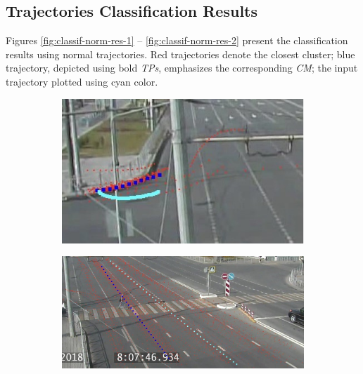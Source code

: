 \subsection{Trajectories Classification Results}


Figures \ref{fig:classif-norm-res-1} -- \ref{fig:classif-norm-res-2} present the classification results using normal trajectories. Red trajectories denote the closest cluster; blue trajectory, depicted using bold \textit{TPs}, emphasizes the corresponding \textit{CM}; the input trajectory plotted using cyan color.

\begin{figure}[!htb]
	\centering
	\begin{subfigure}[!htb]{0.40\textwidth}
		\centering{}
		\includegraphics[width=\textwidth]{images/classif-res/classif-norm-res-1-1.jpeg}
		\caption{}
	\end{subfigure}
	\hfill
	\begin{subfigure}[!htb]{0.57\textwidth}
		\centering{}
		\includegraphics[width=\textwidth]{images/classif-res/classif-norm-res-1-2.jpeg}
		\caption{}
	\end{subfigure}
	\hfill
	\begin{subfigure}[!htb]{0.485\textwidth}

\end{subfigure}
\end{figure}
